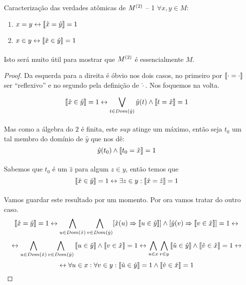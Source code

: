     \begin{theorem}{Caracterização das verdades atômicas de $M^{(2)}$ -- 1}
        $\forall x,y \in M:$
        \begin{enumerate}[label=(\alph*)]
            \item $x  = y \leftrightarrow \left\llbracket\hat{x} = \hat{y}\right\rrbracket = 1$
            \item $x\in y \leftrightarrow \left\llbracket\hat{x} \in \hat{y}\right\rrbracket = 1$
        \end{enumerate}
        \paragraph{}
            Isto será muito útil para mostrar que $M^{(2)}$ é essencialmente $M$.
        \begin{proof}
            Da esquerda para a direita é óbvio nos dois casos, no primeiro por 
            $\left\llbracket\cdot = \cdot\right\rrbracket$ ser ``reflexivo'' e no segundo pela definição de 
            $\hat{\cdot}$. Nos foquemos na volta.

            $$ 
                \left\llbracket\hat x \in \hat y\right\rrbracket = 1 \leftrightarrow \bigvee_{t\in Dom(\hat y)}\hat y(t)\land\left\llbracket t = \hat x\right\rrbracket = 1
            $$
            \paragraph{}
                Mas como a álgebra do $2$ é finita, este $sup$ atinge um máximo, então seja $t_0$ um tal 
                membro do domínio de $\hat y$ que nos dê:
            $$ 
                \hat y(t_0) \land \left\llbracket t_0 = \hat x\right\rrbracket = 1
            $$
            \paragraph{}
                Sabemos que $t_0$ é um $\hat z$ para algum $z\in y$, então temos que 
            $$
                \left\llbracket\hat x \in \hat y\right\rrbracket = 1 \leftrightarrow \exists z\in y: \left\llbracket\hat x = \hat z\right\rrbracket = 1
            $$
            \paragraph{}
                Vamos guardar este resultado por um momento. Por ora vamos tratar do outro caso.
            $$
                \left\llbracket\hat{x} = \hat{y}\right\rrbracket = 1 
                \leftrightarrow \bigwedge_{u\in Dom(\hat x)}\bigwedge_{v\in Dom(\hat y)} [\hat x(u)\Rightarrow \left\llbracket u \in \hat y\right\rrbracket]\land[\hat y(v)\Rightarrow \left\llbracket v \in \hat x\right\rrbracket] =1 
                \leftrightarrow
            $$
            $$  \leftrightarrow \bigwedge_{u\in Dom(\hat x)}\bigwedge_{v\in Dom(\hat y)} \left\llbracket u \in \hat y\right\rrbracket\land\left\llbracket v \in \hat x\right\rrbracket = 1
                \leftrightarrow \bigwedge_{u\in x}\bigwedge_{v\in y} \left\llbracket\hat u \in \hat y\right\rrbracket\land\left\llbracket\hat v \in \hat x\right\rrbracket = 1
                \leftrightarrow
            $$
            $$  \leftrightarrow \forall u\in x:\forall v\in y:\left\llbracket\hat u \in \hat y\right\rrbracket = 1 \land \left\llbracket\hat v \in \hat x\right\rrbracket = 1 $$

\end{proof}
\end{theorem}
